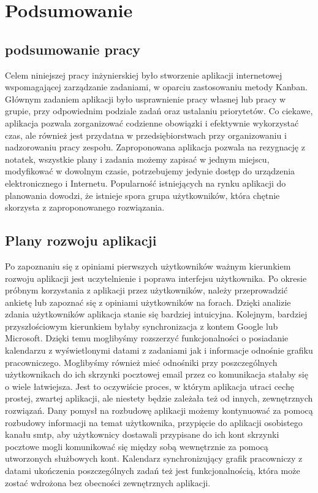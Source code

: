 \chapter{Podsumowanie}

\section{podsumowanie pracy}
\thispagestyle{chapterBeginStyle}

Celem niniejszej pracy inżynierskiej było stworzenie aplikacji internetowej wspomagającej zarządzanie zadaniami, w oparciu zastosowaniu metody Kanban.  Głównym zadaniem aplikacji było usprawnienie pracy własnej lub pracy w grupie, przy odpowiednim podziale zadań oraz ustalaniu priorytetów. Co ciekawe, aplikacja pozwala zorganizować codzienne obowiązki i efektywnie wykorzystać czas, ale również jest przydatna w przedsiębiorstwach przy organizowaniu i nadzorowaniu pracy zespołu. Zaproponowana aplikacja pozwala na rezygnację z notatek, wszystkie plany i zadania możemy zapisać w jednym miejscu, modyfikować w dowolnym czasie, potrzebujemy jedynie dostęp do urządzenia elektronicznego i Internetu. Popularność istniejących na rynku aplikacji do planowania dowodzi, że istnieje spora grupa użytkowników, która chętnie skorzysta z zaproponowanego rozwiązania. 

\section{Plany rozwoju aplikacji}
Po zapoznaniu się z opiniami pierwszych użytkowników ważnym kierunkiem rozwoju aplikacji jest uczytelnienie i poprawa interfejsu użytkownika. Po okresie próbnym korzystania z aplikacji przez użytkowników, należy przeprowadzić ankietę lub zapoznać się z opiniami użytkowników na forach. Dzięki analizie zdania użytkowników aplikacja stanie się bardziej intuicyjna.
Kolejnym, bardziej przyszłościowym kierunkiem byłaby synchronizacja z kontem Google lub Microsoft. Dzięki temu moglibyśmy rozszerzyć funkcjonalności o posiadanie kalendarzu z wyświetlonymi datami z zadaniami jak i informacje odnośnie grafiku pracowniczego. Moglibyśmy również mieć odnośniki przy poszczególnych użytkownikach do ich skrzynki pocztowej email przez co komunikacja stałaby się o wiele łatwiejsza.  Jest to oczywiście proces, w którym aplikacja utraci cechę prostej, zwartej aplikacji, ale niestety będzie zależała też od innych, zewnętrznych rozwiązań. Dany pomysł na rozbudowę aplikacji możemy kontynuować za pomocą rozbudowy informacji na temat użytkownika, przypięcie do aplikacji osobistego kanału smtp, aby użytkownicy dostawali przypisane do ich kont skrzynki pocztowe mogli komunikować się między sobą wewnętrznie za pomocą utworzonych służbowych kont. Kalendarz synchronizujący grafik pracowniczy z datami ukończenia poszczególnych zadań też jest funkcjonalnością, która może zostać wdrożona bez obecności zewnętrznych aplikacji.

